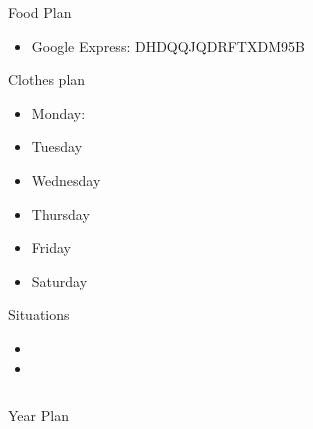 \begin{columns}
    \begin{column}{0.20\linewidth}
      \begin{block}{Food Plan} 
        \begin{itemize}
          \tiny \item \tiny Google Express: DHDQQJQDRFTXDM95B
        \end{itemize}
      \end{block} 
      \begin{block}{Clothes plan} 
        \begin{itemize}
          \tiny \item \tiny Monday: 
        \item \tiny Tuesday
        \item \tiny Wednesday
        \item \tiny Thursday
        \item \tiny Friday
        \item \tiny Saturday
        \end{itemize} 
      \end{block} 
      
      \begin{block}{Situations}
        \begin{itemize}
          \tiny \item \tiny 
        \item \tiny 
        \end{itemize}
      \end{block}
    \end{column}
\end{columns}
\begin{frame}{Year Plan}

\end{frame}
